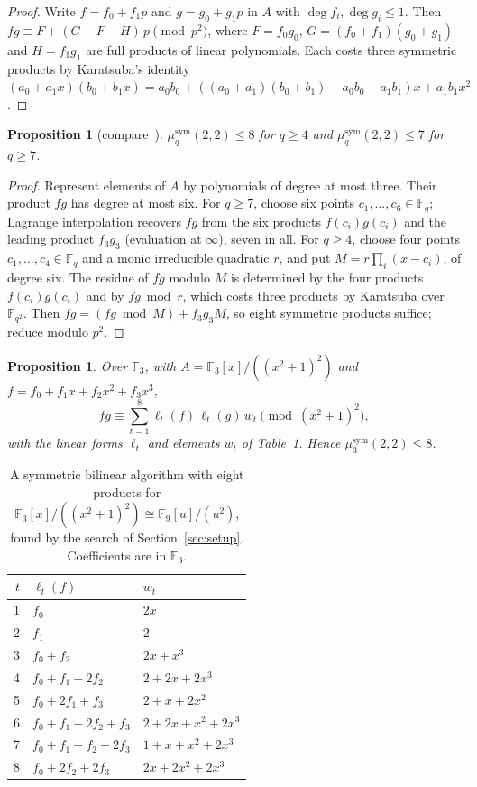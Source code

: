 \documentclass[11pt]{amsart}
\newtheorem{proposition}[theorem]{Proposition}
\theoremstyle{definition}
\theoremstyle{remark}
\newcommand{\F}{\mathbb F}
\begin{document}
\begin{proof}
Write $f=f_0+f_1p$ and $g=g_0+g_1p$ in $A$ with $\deg f_i,\deg g_i\le1$. Then $fg\equiv F+(G-F-H)\,p\pmod{p^2}$, where $F=f_0g_0$, $G=(f_0+f_1)(g_0+g_1)$ and $H=f_1g_1$ are full products of linear polynomials. Each costs three symmetric products by Karatsuba's identity $(a_0+a_1x)(b_0+b_1x)=a_0b_0+((a_0+a_1)(b_0+b_1)-a_0b_0-a_1b_1)x+a_1b_1x^2$.
\end{proof}

\begin{proposition}[{compare~\cite[Example~4.4]{Randriambololona2012}}]\label{prop:crt}
$\mu_q^{\mathrm{sym}}(2,2)\le8$ for $q\ge4$ and $\mu_q^{\mathrm{sym}}(2,2)\le7$ for $q\ge7$.
\end{proposition}

\begin{proof}
Represent elements of $A$ by polynomials of degree at most three. Their product $fg$ has degree at most six. For $q\ge7$, choose six points $c_1,\dots,c_6\in\F_q$; Lagrange interpolation recovers $fg$ from the six products $f(c_i)g(c_i)$ and the leading product $f_3g_3$ (evaluation at $\infty$), seven in all. For $q\ge4$, choose four points $c_1,\dots,c_4\in\F_q$ and a monic irreducible quadratic $r$, and put $M=r\prod_i(x-c_i)$, of degree six. The residue of $fg$ modulo $M$ is determined by the four products $f(c_i)g(c_i)$ and by $fg\bmod r$, which costs three products by Karatsuba over $\F_{q^2}$. Then $fg=(fg\bmod M)+f_3g_3M$, so eight symmetric products suffice; reduce modulo $p^2$.
\end{proof}

\begin{proposition}\label{prop:f3}
Over $\F_3$, with $A=\F_3[x]/((x^2+1)^2)$ and $f=f_0+f_1x+f_2x^2+f_3x^3$,
\[
 fg\equiv\sum_{t=1}^{8}\ell_t(f)\,\ell_t(g)\,w_t\pmod{(x^2+1)^2},
\]
with the linear forms $\ell_t$ and elements $w_t$ of Table~\ref{tab:f3}. Hence $\mu_3^{\mathrm{sym}}(2,2)\le8$.
\end{proposition}

\begin{table}[ht]
\centering
\begin{tabular}{rll}
\toprule
$t$ & $\ell_t(f)$ & $w_t$\\
\midrule
1 & $f_0$ & $2x$\\
2 & $f_1$ & $2$\\
3 & $f_0+f_2$ & $2x+x^3$\\
4 & $f_0+f_1+2f_2$ & $2+2x+2x^3$\\
5 & $f_0+2f_1+f_3$ & $2+x+2x^2$\\
6 & $f_0+f_1+2f_2+f_3$ & $2+2x+x^2+2x^3$\\
7 & $f_0+f_1+f_2+2f_3$ & $1+x+x^2+2x^3$\\
8 & $f_0+2f_2+2f_3$ & $2x+2x^2+2x^3$\\
\bottomrule
\end{tabular}
\caption{A symmetric bilinear algorithm with eight products for $\F_3[x]/((x^2+1)^2)\cong\F_9[u]/(u^2)$, found by the search of Section~\ref{sec:setup}. Coefficients are in $\F_3$.}
\label{tab:f3}
\end{table}
\end{document}
